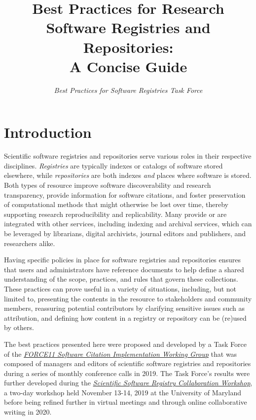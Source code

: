 \documentclass[11pt]{article}
\title{Best Practices for Research Software Registries and Repositories:\\
A Concise Guide}
\author{\emph{Best Practices for Software Registries Task Force}}
\begin{document}
\maketitle
\tableofcontents

\newcommand{\sectionbreak}{\clearpage}


\section{Introduction}
\label{introduction}

Scientific software registries and repositories serve various roles in their respective disciplines. \emph{Registries} are typically indexes or catalogs of software stored elsewhere, while \emph{repositories} are both indexes \emph{and} places where software is stored. Both types of resource improve software discoverability and research transparency, provide information for software citations, and foster preservation of computational methods that might otherwise be lost over time, thereby supporting research reproducibility and replicability. Many provide or are integrated with other services, including indexing and archival services, which can be leveraged by librarians, digital archivists, journal editors and publishers, and researchers alike.

Having specific policies in place for software registries and repositories ensures that users and administrators have reference documents to help define a shared understanding of the scope, practices, and rules that govern these collections. These practices can prove useful in a variety of situations, including, but not limited to, presenting the contents in the resource to stakeholders and community members, reassuring potential contributors by clarifying sensitive issues such as attribution, and defining how content in a registry or repository can be (re)used by others.

The best practices presented here were proposed and developed by a Task Force of the \href{https://github.com/force11/force11-sciwg}{\emph{FORCE11 Software Citation Implementation Working Group}} that was composed of managers and editors of scientific software registries and repositories during a series of monthly conference calls in 2019. The Task Force's results were further developed during the \href{https://asclnet.github.io/SWRegistryWorkshop/}{\emph{Scientific Software Registry Collaboration Workshop}}, a two-day workshop held November 13-14, 2019 at the University of Maryland before being refined further in virtual meetings and through online collaborative writing in 2020.
\end{document}
